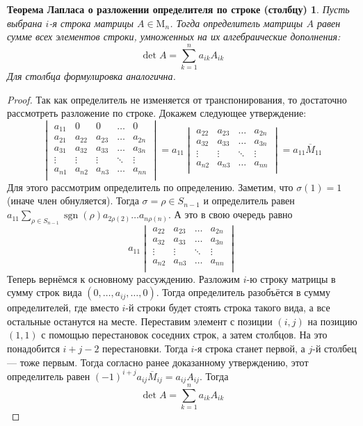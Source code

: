 \documentclass[a4paper, 12pt]{article}
\DeclareMathOperator{\sgn}{sgn}
\newtheorem*{laplace_theorem}{Теорема Лапласа о разложении определителя по строке (столбцу)}
\begin{document}
\begin{laplace_theorem}
Пусть выбрана $i$-я строка матрицы $A \in \mathrm{M}_n$. Тогда определитель матрицы $A$ равен сумме всех элементов строки, умноженных на их алгебраические дополнения:
\[\det{A} = \sum_{k = 1}^{n} a_{ik}A_{ik}\]
Для столбца формулировка аналогична.
\end{laplace_theorem}
\begin{proof}
Так как определитель не изменяется от транспонирования, то достаточно рассмотреть разложение по строке.
Докажем следующее утверждение:
\[\begin{vmatrix}
a_{11} & 0 & 0 & \ldots & 0 \\
a_{21} & a_{22} & a_{23} & \ldots & a_{2n} \\
a_{31} & a_{32} & a_{33} & \ldots & a_{3n} \\
\vdots & \vdots & \vdots & \ddots & \vdots \\
a_{n1} & a_{n2} & a_{n3} & \ldots & a_{nn} \\
\end{vmatrix} = a_{11}
\begin{vmatrix}
a_{22} & a_{23} & \ldots & a_{2n} \\
a_{32} & a_{33} & \ldots & a_{3n} \\
\vdots & \vdots & \ddots & \vdots \\
a_{n2} & a_{n3} & \ldots & a_{nn} \\
\end{vmatrix} = a_{11}\overline{M}_{11}\]
Для этого рассмотрим определитель по определению. Заметим, что $\sigma(1) = 1$ (иначе член обнуляется). Тогда $\sigma = \rho \in S_{n-1}$ и определитель равен $a_{11}\sum\limits_{\rho \in S_{n-1}} \sgn(\rho)a_{2\rho(2)}\ldots a_{n\rho(n)}$. А это в свою очередь равно
\[a_{11}\begin{vmatrix}
a_{22} & a_{23} & \ldots & a_{2n} \\
a_{32} & a_{33} & \ldots & a_{3n} \\
\vdots & \vdots & \ddots & \vdots \\
a_{n2} & a_{n3} & \ldots & a_{nn} \\
\end{vmatrix}\]
Теперь вернёмся к основному рассуждению. Разложим $i$-ю строку матрицы в сумму строк вида $(0,\ldots, a_{ij}, \ldots, 0)$. Тогда определитель разобъётся в сумму определителей, где вместо $i$-й строки будет стоять строка такого вида, а все остальные останутся на месте. Переставим элемент с позиции $(i, j)$ на позицию $(1, 1)$ с помощью перестановок соседних строк, а затем столбцов. На это понадобится $i+j-2$ перестановки. Тогда $i$-я строка станет первой, а $j$-й столбец --- тоже первым. Тогда согласно ранее доказанному утверждению, этот определитель равен $(-1)^{i+j}a_{ij}\overline{M}_{ij} = a_{ij}A_{ij}$. Тогда \[\det{A} = \sum_{k = 1}^{n} a_{ik}A_{ik}\]
\end{proof}
\end{document}
